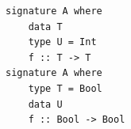 \begin{verbatim}
signature A where
    data T
    type U = Int
    f :: T -> T
signature A where
    type T = Bool
    data U
    f :: Bool -> Bool
\end{verbatim}



